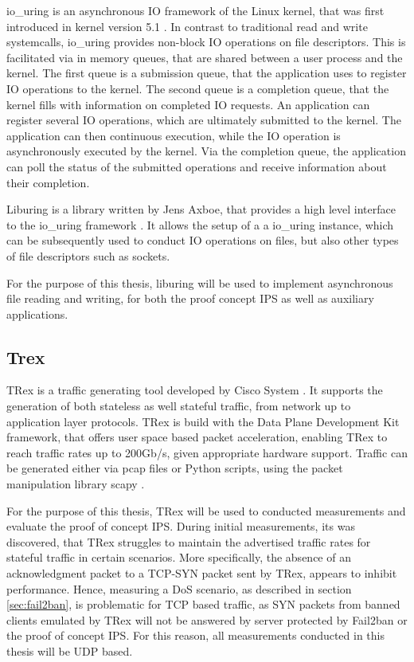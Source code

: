 io\_uring is an asynchronous \ac{IO} framework of the Linux kernel, that was first introduced in kernel version 5.1 \cite{io_uring}.
In contrast to traditional read and write systemcalls, io\_uring provides non-block \ac{IO} operations on
file descriptors. This is facilitated via in memory queues, that are shared between a user process and the kernel.
The first queue is a submission queue, that the application uses to register \ac{IO} operations to the
kernel. The second queue is a completion queue, that the kernel fills with information on completed \ac{IO} requests.
An application can register several \ac{IO} operations, which are ultimately submitted to the kernel.
The application can then continuous execution, while the \ac{IO} operation is asynchronously executed by the kernel.
Via the completion queue, the application can poll the status of the submitted operations
and receive information about their completion.        
\par
Liburing is a library written by Jens Axboe, that provides a high level interface to the io\_uring framework \cite{liburing}.
It allows the setup of a a io\_uring instance, which can be subsequently used to conduct \ac{IO} operations
on files, but also other types of file descriptors such as sockets.
\par
For the purpose of this thesis, liburing will be used to implement asynchronous file reading and writing,
for both the proof concept \ac{IPS} as well as auxiliary applications. 

\subsection{Trex} \label{sec:trex}

TRex is a traffic generating tool developed by Cisco System \cite{trex}. It supports the generation of both
stateless as well stateful traffic, from network up to application layer protocols. TRex is build with the Data Plane Development Kit framework,
that offers user space based packet acceleration, enabling TRex to reach traffic rates up to 200Gb/s, given appropriate hardware support. 
Traffic can be generated either via pcap files or Python scripts, using the packet manipulation library scapy \cite{scapy}.
\par 
For the purpose of this thesis, TRex will be used to conducted measurements and evaluate the proof of concept \ac{IPS}.
During initial measurements, its was discovered, that TRex struggles to maintain the advertised traffic rates for stateful traffic in certain scenarios.
More specifically, the absence of an acknowledgment packet to a \ac{TCP}-SYN packet sent by TRex, appears to inhibit performance.
Hence, measuring a \ac{DoS} scenario, as described in section \ref{sec:fail2ban}, is problematic for \ac{TCP} based traffic, as SYN packets from banned clients
emulated by TRex will not be answered by server protected by Fail2ban or the proof of concept \ac{IPS}. For this reason, all measurements conducted in this
thesis will be \ac{UDP} based.

